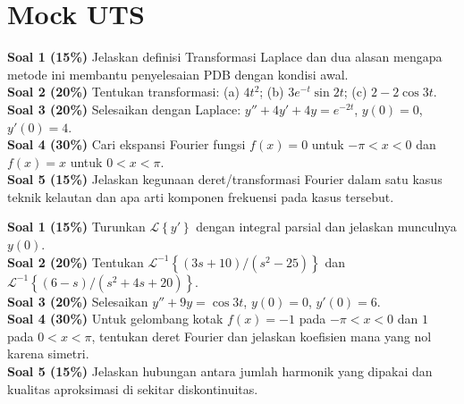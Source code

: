 \documentclass[10pt,a4paper]{article}
\newcommand{\Lap}[1]{\mathcal{L}\left\{#1\right\}}
\newcommand{\iLap}[1]{\mathcal{L}^{-1}\left\{#1\right\}}
\begin{document}
\section*{Mock UTS}
\begin{exam}[title={Mock UTS A - Format 100 menit}]
\textbf{Soal 1 (15\%)} Jelaskan definisi Transformasi Laplace dan dua alasan mengapa metode ini membantu penyelesaian PDB dengan kondisi awal.\\[1mm]
\textbf{Soal 2 (20\%)} Tentukan transformasi: (a) $4t^2$; (b) $3e^{-t}\sin 2t$; (c) $2-2\cos 3t$.\\[1mm]
\textbf{Soal 3 (20\%)} Selesaikan dengan Laplace: $y''+4y'+4y=e^{-2t}$, $y(0)=0$, $y'(0)=4$.\\[1mm]
\textbf{Soal 4 (30\%)} Cari ekspansi Fourier fungsi $f(x)=0$ untuk $-\pi<x<0$ dan $f(x)=x$ untuk $0<x<\pi$.\\[1mm]
\textbf{Soal 5 (15\%)} Jelaskan kegunaan deret/transformasi Fourier dalam satu kasus teknik kelautan dan apa arti komponen frekuensi pada kasus tersebut.
\end{exam}

\begin{exam}[title={Mock UTS B - Varian}]
\textbf{Soal 1 (15\%)} Turunkan $\Lap{y'}$ dengan integral parsial dan jelaskan munculnya $y(0)$.\\[1mm]
\textbf{Soal 2 (20\%)} Tentukan $\iLap{(3s+10)/(s^2-25)}$ dan $\iLap{(6-s)/(s^2+4s+20)}$.\\[1mm]
\textbf{Soal 3 (20\%)} Selesaikan $y''+9y=\cos 3t$, $y(0)=0$, $y'(0)=6$.\\[1mm]
\textbf{Soal 4 (30\%)} Untuk gelombang kotak $f(x)=-1$ pada $-\pi<x<0$ dan $1$ pada $0<x<\pi$, tentukan deret Fourier dan jelaskan koefisien mana yang nol karena simetri.\\[1mm]
\textbf{Soal 5 (15\%)} Jelaskan hubungan antara jumlah harmonik yang dipakai dan kualitas aproksimasi di sekitar diskontinuitas.
\end{exam}
\newpage
\end{document}
